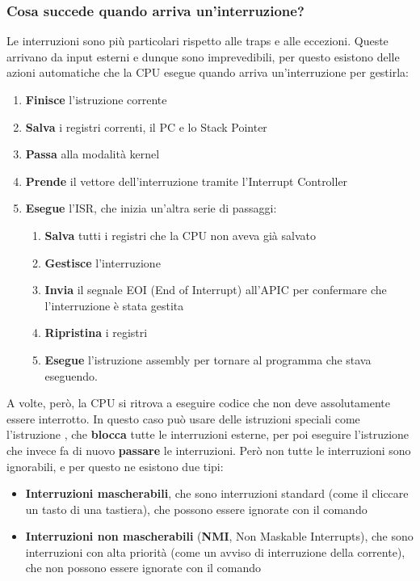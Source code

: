 \documentclass[11pt, a4paper, titlepage, oneside]{scrbook}
\begin{document}
\subsubsection*{Cosa succede quando arriva un'interruzione?}

Le interruzioni sono più particolari rispetto alle traps e alle eccezioni. Queste arrivano da input esterni e dunque sono imprevedibili, per questo esistono delle azioni automatiche che la CPU esegue quando arriva un'interruzione per gestirla:
\begin{enumerate}[label=\arabic*°]
    \item \textbf{Finisce} l'istruzione corrente
    \item \textbf{Salva} i registri correnti, il PC e lo Stack Pointer
    \item \textbf{Passa} alla modalità kernel
    \item \textbf{Prende} il vettore dell'interruzione tramite l'Interrupt Controller
    \item \textbf{Esegue} l'ISR, che inizia un'altra serie di passaggi:
    \begin{enumerate}[label=\arabic*°]
        \item \textbf{Salva} tutti i registri che la CPU non aveva già salvato
        \item \textbf{Gestisce} l'interruzione
        \item \textbf{Invia} il segnale EOI (End of Interrupt) all'APIC per confermare che l'interruzione è stata gestita
        \item \textbf{Ripristina} i registri
        \item \textbf{Esegue} l'istruzione assembly  per tornare al programma che stava eseguendo.
    \end{enumerate}
\end{enumerate}

A volte, però, la CPU si ritrova a eseguire codice che non deve assolutamente essere interrotto. In questo caso può usare delle istruzioni speciali come l'istruzione , che \textbf{blocca} tutte le interruzioni esterne, per poi eseguire l'istruzione  che invece fa di nuovo \textbf{passare} le interruzioni. Però non tutte le interruzioni sono ignorabili, e per questo ne esistono due tipi:
\begin{itemize}
    \item \textbf{Interruzioni mascherabili}, che sono interruzioni standard (come il cliccare un tasto di una tastiera), che possono essere ignorate con il comando 
    \item \textbf{Interruzioni non mascherabili} (\textbf{NMI}, Non Maskable Interrupts), che sono interruzioni con alta priorità (come un avviso di interruzione della corrente), che non possono essere ignorate con il comando 
\end{itemize}
\end{document}
